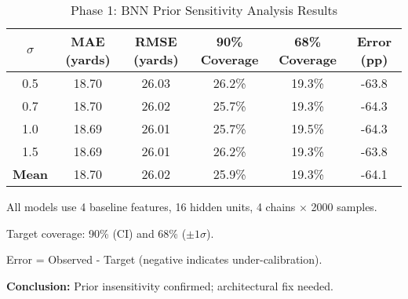 \begin{table}[htbp]
\centering
\caption{Phase 1: BNN Prior Sensitivity Analysis Results}
\label{tab:phase1_prior_sensitivity}
\begin{tabular}{cccccc}
\toprule
 \textbf{$\sigma$} & \textbf{MAE (yards)} & \textbf{RMSE (yards)} & \textbf{90\% Coverage} & \textbf{68\% Coverage} & \textbf{Error (pp)} \\
\midrule
0.5 & 18.70 & 26.03 & 26.2\% & 19.3\% & -63.8 \\
0.7 & 18.70 & 26.02 & 25.7\% & 19.3\% & -64.3 \\
1.0 & 18.69 & 26.01 & 25.7\% & 19.5\% & -64.3 \\
1.5 & 18.69 & 26.01 & 26.2\% & 19.3\% & -63.8 \\
\midrule
\textbf{Mean} & 18.70 & 26.02 & 25.9\% & 19.3\% & -64.1 \\
\bottomrule
\end{tabular}
\begin{tablenotes}
\small
\item All models use 4 baseline features, 16 hidden units, 4 chains $\times$ 2000 samples.
\item Target coverage: 90\% (CI) and 68\% ($\pm 1\sigma$).
\item Error = Observed - Target (negative indicates under-calibration).
\item \textbf{Conclusion:} Prior insensitivity confirmed; architectural fix needed.
\end{tablenotes}
\end{table}
